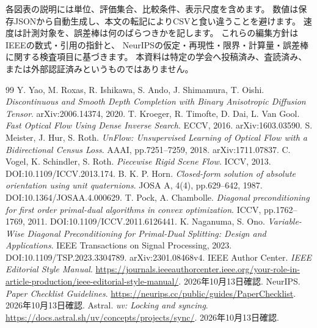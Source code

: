 \documentclass[a4paper,11pt]{ltjsarticle}
\theoremstyle{definition}
\begin{document}
各図表の説明には単位、評価集合、比較条件、表示尺度を含めます。
数値は保存JSONから自動生成し、本文の転記によりCSVと食い違うことを避けます。
速度は計測対象を、誤差棒は何のばらつきかを記します。
これらの編集方針はIEEEの数式・引用の指針\cite{ieee}と、
NeurIPSの仮定・再現性・限界・計算量・誤差棒に関する検査項目\cite{checklist}に基づきます。
本資料は特定の学会へ投稿済み、査読済み、または外部認証済みというものではありません。

\begin{thebibliography}{99}\small
{} Y. Yao, M. Roxas, R. Ishikawa, S. Ando, J. Shimamura, T. Oishi.
\emph{Discontinuous and Smooth Depth Completion with Binary Anisotropic Diffusion Tensor}. arXiv:2006.14374, 2020.
 T. Kroeger, R. Timofte, D. Dai, L. Van Gool.
\emph{Fast Optical Flow Using Dense Inverse Search}. ECCV, 2016. arXiv:1603.03590.
 S. Meister, J. Hur, S. Roth.
\emph{UnFlow: Unsupervised Learning of Optical Flow with a Bidirectional Census Loss}. AAAI, pp.7251--7259, 2018. arXiv:1711.07837.
 C. Vogel, K. Schindler, S. Roth.
\emph{Piecewise Rigid Scene Flow}. ICCV, 2013. DOI:10.1109/ICCV.2013.174.
 B. K. P. Horn.
\emph{Closed-form solution of absolute orientation using unit quaternions}. JOSA A, 4(4), pp.629--642, 1987. DOI:10.1364/JOSAA.4.000629.
 T. Pock, A. Chambolle.
\emph{Diagonal preconditioning for first order primal-dual algorithms in convex optimization}. ICCV, pp.1762--1769, 2011. DOI:10.1109/ICCV.2011.6126441.
 K. Naganuma, S. Ono.
\emph{Variable-Wise Diagonal Preconditioning for Primal-Dual Splitting: Design and Applications}. IEEE Transactions on Signal Processing, 2023. DOI:10.1109/TSP.2023.3304789. arXiv:2301.08468v4.
 IEEE Author Center. \emph{IEEE Editorial Style Manual}.
\url{https://journals.ieeeauthorcenter.ieee.org/your-role-in-article-production/ieee-editorial-style-manual/}. 2026年10月13日確認.
 NeurIPS. \emph{Paper Checklist Guidelines}.
\url{https://neurips.cc/public/guides/PaperChecklist}. 2026年10月13日確認.
 Astral. \emph{uv: Locking and syncing}.
\url{https://docs.astral.sh/uv/concepts/projects/sync/}. 2026年10月13日確認.
\end{thebibliography}
\end{document}
